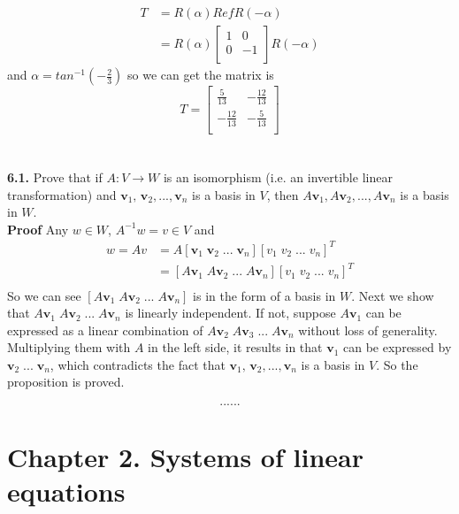 \documentclass[11pt, a4paper]{article}
\begin{document}
\begin{equation*}
  \begin{split}
    T &= 
    R(\alpha)RefR(-\alpha) \\
    &=
    R(\alpha)
    \begin{bmatrix}
    1 & 0 \\
    0 & -1 \\
    \end{bmatrix}
    R(-\alpha)
  \end{split}
\end{equation*}
and $\alpha = tan^{-1}(-\frac{2}{3})$ so we can get the matrix is 
\begin{equation*}
    T = 
    \begin{bmatrix}
    \frac{5}{13} & -\frac{12}{13} \\
    -\frac{12}{13} & -\frac{5}{13} \\
    \end{bmatrix}
\end{equation*}
\\
\\ \textbf{6.1.} Prove that if $A: V \rightarrow{} W$ is an isomorphism (i.e. an invertible linear transformation) and $\textbf{v$_1$, v$_2$},...,\textbf{v$_n$}$ is a basis in $V$, then $A\textbf{v$_1$}, A\textbf{v$_2$},...,A\textbf{v$_n$}$ is a basis in $W$.\\
\textbf{Proof} Any $w\in W$, $A^{-1}w = v \in V$ and 
\begin{equation}
\begin{split}
    w = Av &= A[\textbf{v$_1$}\; \textbf{v$_2$} \; ...\; \textbf{v$_n$}][v_1 \;  v_2 \; ... \; v_n]^T \\
    &= [A\textbf{v$_1$}\; A\textbf{v$_2$} \; ...\; A\textbf{v$_n$}][v_1 \;  v_2 \; ... \; v_n]^T \\
\end{split}
\end{equation}
So we can see $[A\textbf{v$_1$}\; A\textbf{v$_2$} \; ...\; A\textbf{v$_n$}]$ is in the form of a basis in $W$. Next we show that $A\textbf{v$_1$}\; A\textbf{v$_2$} \; ...\; A\textbf{v$_n$}$ is linearly independent. If not, suppose $A\textbf{v$_1$}$ can be expressed as a linear combination of $ A\textbf{v$_2$} \; A\textbf{v$_3$} \;...\; A\textbf{v$_n$}$ without loss of generality. Multiplying them with $A$ in the left side, it results in that $\textbf{v$_1$}$ can be expressed by $ \textbf{v$_2$} \; ...\; \textbf{v$_n$}$, which contradicts the fact that $\textbf{v$_1$, v$_2$},...,\textbf{v$_n$}$ is a basis in $V$. So the proposition is proved.


$$......$$
\section*{Chapter 2. Systems of linear equations}
\end{document}
